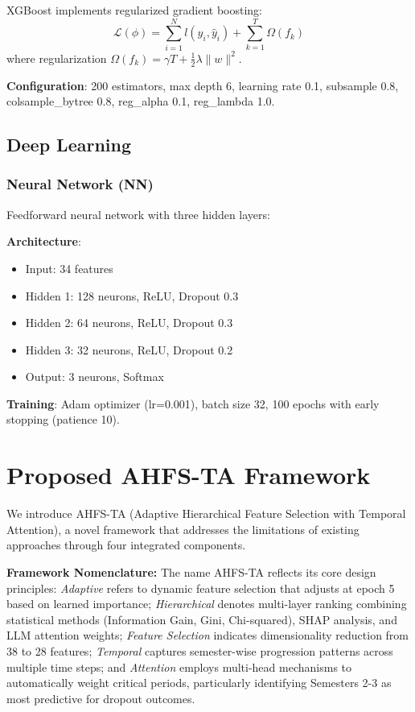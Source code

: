 \documentclass[journal]{IEEEtran}
\begin{document}
XGBoost implements regularized gradient boosting:
\begin{equation}
\mathcal{L}(\phi) = \sum_{i=1}^{N} l(y_i, \hat{y}_i) + \sum_{k=1}^{T} \Omega(f_k)
\end{equation}
where regularization $\Omega(f_k) = \gamma T + \frac{1}{2}\lambda\|w\|^2$.

\textbf{Configuration}: 200 estimators, max depth 6, learning rate 0.1, subsample 0.8, colsample\_bytree 0.8, reg\_alpha 0.1, reg\_lambda 1.0.

\subsection{Deep Learning}

\subsubsection{Neural Network (NN)}

Feedforward neural network with three hidden layers:

\textbf{Architecture}:
\begin{itemize}
\item Input: 34 features
\item Hidden 1: 128 neurons, ReLU, Dropout 0.3
\item Hidden 2: 64 neurons, ReLU, Dropout 0.3
\item Hidden 3: 32 neurons, ReLU, Dropout 0.2
\item Output: 3 neurons, Softmax
\end{itemize}

\textbf{Training}: Adam optimizer (lr=0.001), batch size 32, 100 epochs with early stopping (patience 10).

\section{Proposed AHFS-TA Framework}

We introduce AHFS-TA (Adaptive Hierarchical Feature Selection with Temporal Attention), a novel framework that addresses the limitations of existing approaches through four integrated components.

\textbf{Framework Nomenclature:} The name AHFS-TA reflects its core design principles: \textit{Adaptive} refers to dynamic feature selection that adjusts at epoch 5 based on learned importance; \textit{Hierarchical} denotes multi-layer ranking combining statistical methods (Information Gain, Gini, Chi-squared), SHAP analysis, and LLM attention weights; \textit{Feature Selection} indicates dimensionality reduction from 38 to 28 features; \textit{Temporal} captures semester-wise progression patterns across multiple time steps; and \textit{Attention} employs multi-head mechanisms to automatically weight critical periods, particularly identifying Semesters 2-3 as most predictive for dropout outcomes.
\end{document}
